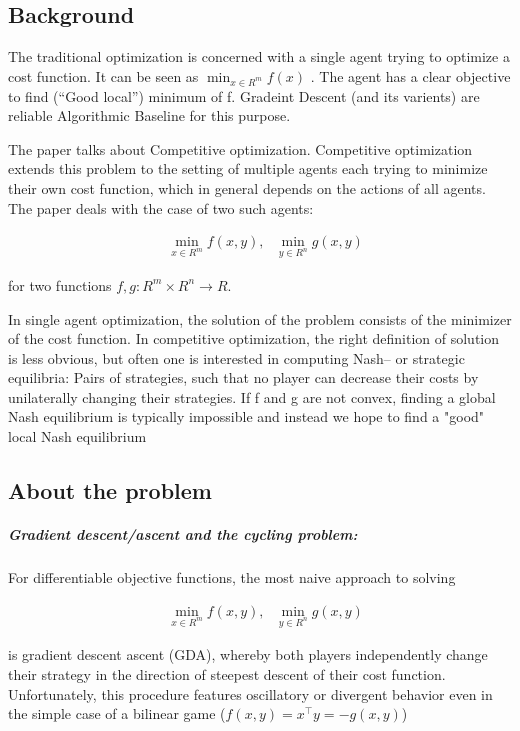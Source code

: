 \documentclass[11pt]{article}
\begin{document}
    \subsection{Background}\label{background}

The traditional optimization is concerned with a single agent trying to
optimize a cost function. It can be seen as \(\min_{x \in R^m} f(x)\) .
The agent has a clear objective to find (``Good local'') minimum of f.
Gradeint Descent (and its varients) are reliable Algorithmic Baseline
for this purpose.

The paper talks about Competitive optimization. Competitive optimization
extends this problem to the setting of multiple agents each trying to
minimize their own cost function, which in general depends on the
actions of all agents. The paper deals with the case of two such agents:

\begin{align}
        &\min_{x \in R^m} f(x,y),\ \ \ \min_{y \in R^n} g(x,y)
    \end{align}

for two functions \(f,g: R^m \times R^n \longrightarrow R\).

In single agent optimization, the solution of the problem consists of
the minimizer of the cost function. In competitive optimization, the
right definition of solution is less obvious, but often one is
interested in computing Nash-- or strategic equilibria: Pairs of
strategies, such that no player can decrease their costs by unilaterally
changing their strategies. If f and g are not convex, finding a global
Nash equilibrium is typically impossible and instead we hope to find a
"good" local Nash equilibrium

    \subsection{About the problem}\label{about-the-problem}

\subparagraph{Gradient descent/ascent and the cycling
problem:}\label{gradient-descentascent-and-the-cycling-problem}

For differentiable objective functions, the most naive approach to
solving

\begin{align}
        \label{eqn:game}
        &\min_{x \in R^m} f(x,y),\ \ \ \min_{y \in R^n} g(x,y)
    \end{align}

is gradient descent ascent (GDA), whereby both players independently
change their strategy in the direction of steepest descent of their cost
function. Unfortunately, this procedure features oscillatory or
divergent behavior even in the simple case of a bilinear game
(\(f(x,y) = x^{\top} y = -g(x,y)\))
\end{document}
